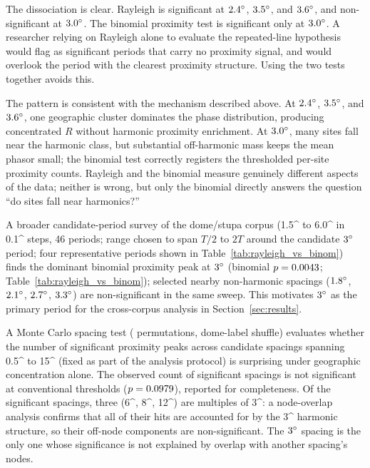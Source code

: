 \documentclass[12pt,a4paper]{article}
\newcommand{\degr}{\ifmmode^\circ\else\textdegree{}\fi}
\begin{document}
The dissociation is clear. Rayleigh is significant at
$2.4\degr$, $3.5\degr$, and $3.6\degr$, and non-significant at
$3.0\degr$. The binomial proximity test is significant only at
$3.0\degr$. A researcher relying on Rayleigh alone to evaluate the
repeated-line hypothesis would flag as significant periods that carry no proximity
signal, and would overlook the period with the clearest proximity
structure. Using the two tests together avoids this.

The pattern is consistent with the mechanism described above. At
$2.4\degr$, $3.5\degr$, and $3.6\degr$, one geographic cluster
dominates the phase distribution, producing concentrated $R$ without
harmonic proximity enrichment. At $3.0\degr$, many sites fall near the
harmonic class, but substantial off-harmonic mass keeps the mean phasor
small; the binomial test correctly registers the thresholded per-site
proximity counts. Rayleigh and the binomial measure genuinely
different aspects of the data; neither is wrong, but only the binomial
directly answers the question ``do sites fall near harmonics?''

A broader candidate-period survey of the dome/stupa corpus
(1.5\degr{} to 6.0\degr{} in 0.1\degr{} steps, 46 periods; range
chosen to span $T/2$ to $2T$ around the candidate $3\degr$ period;
four representative periods shown in Table~\ref{tab:rayleigh_vs_binom})
finds the dominant binomial proximity peak at $3\degr$
(binomial $p = 0.0043{}$; Table~\ref{tab:rayleigh_vs_binom});
selected nearby non-harmonic spacings ($1.8\degr$, $2.1\degr$, $2.7\degr$,
$3.3\degr$) are non-significant in the same sweep. This motivates $3\degr$ as the
primary period for the cross-corpus analysis in Section~\ref{sec:results}.

A Monte Carlo spacing test (\simNperms{} permutations, dome-label
shuffle) evaluates whether the number of significant proximity peaks
across \mcNcandidates{} candidate spacings spanning 0.5\degr{} to
15\degr{} (fixed as part of the analysis protocol) is surprising
under geographic concentration alone. The observed count of
\mcDomeNsigObs{} significant spacings is not significant at
conventional thresholds ($p = 0.0979{}$), reported for
completeness. Of the \mcDomeNsigObs{} significant spacings, three
(6\degr{}, 8\degr{}, 12\degr{}) are multiples of 3\degr{}: a
node-overlap analysis confirms that all of their hits are accounted
for by the 3\degr{} harmonic structure, so their off-node components
are non-significant. The $3\degr$ spacing is the only one whose
significance is not explained by overlap with another spacing's nodes.
\end{document}
